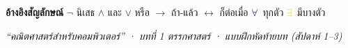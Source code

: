 \documentclass[a4paper,14pt]{article}
\newcommand{\A}{\textcolor{navy}{$\forall$}}
\newcommand{\E}{\textcolor{gold}{$\exists$}}
\begin{document}
\begin{tcolorbox}[colback=white,colframe=line,arc=2mm,boxrule=0.3pt,
  left=8pt,right=8pt,top=4pt,bottom=4pt]
\begin{center}
\textbf{อ้างอิงสัญลักษณ์} \quad
$\neg$ นิเสธ \quad $\land$ และ \quad $\lor$ หรือ \quad $\rightarrow$ ถ้า-แล้ว \quad $\leftrightarrow$ ก็ต่อเมื่อ \quad
\A\ ทุกตัว \quad \E\ มีบางตัว
\end{center}
\end{tcolorbox}

\vfill

\begin{center}
\small\itshape\color{gray}
``คณิตศาสตร์สำหรับคอมพิวเตอร์'' · บทที่ 1 ตรรกศาสตร์ · แบบฝึกหัดท้ายบท (สัปดาห์ 1--3)
\end{center}
\end{document}
